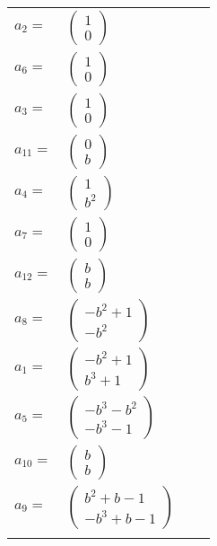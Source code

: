 \documentclass[1p]{elsarticle_modified}
\theoremstyle{definition}
\begin{document}
\begin{tabular}{m{7pt} m{180pt} m{7pt} m{180pt} }
\flushright $a_{2}=$&$\begin{pmatrix}1\\0\end{pmatrix}$ \\
\flushright $a_{6}=$&$\begin{pmatrix}1\\0\end{pmatrix}$ \\
\flushright $a_{3}=$&$\begin{pmatrix}1\\0\end{pmatrix}$ \\
\flushright $a_{11}=$&$\begin{pmatrix}0\\b\end{pmatrix}$ \\
\flushright $a_{4}=$&$\begin{pmatrix}1\\b^2\end{pmatrix}$ \\
\flushright $a_{7}=$&$\begin{pmatrix}1\\0\end{pmatrix}$ \\
\flushright $a_{12}=$&$\begin{pmatrix}b\\b\end{pmatrix}$ \\
\flushright $a_{8}=$&$\begin{pmatrix}- b^2+1\\- b^2\end{pmatrix}$ \\
\flushright $a_{1}=$&$\begin{pmatrix}- b^2+1\\b^3+1\end{pmatrix}$ \\
\flushright $a_{5}=$&$\begin{pmatrix}- b^3- b^2\\- b^3-1\end{pmatrix}$ \\
\flushright $a_{10}=$&$\begin{pmatrix}b\\b\end{pmatrix}$ \\
\flushright $a_{9}=$&$\begin{pmatrix}b^2+b-1\\- b^3+b-1\end{pmatrix}$\\&\end{tabular}
\end{document}
